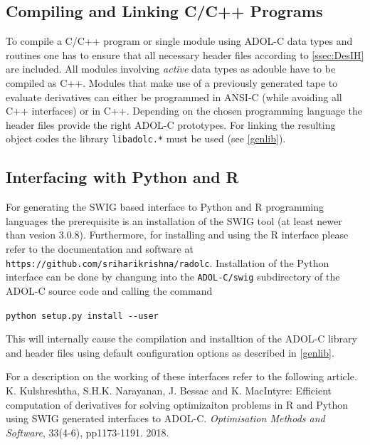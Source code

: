 \documentclass[11pt,twoside]{article}
\begin{document}
\subsection{Compiling and Linking C/C++ Programs}
%
To compile a C/C++ program or single module using ADOL-C
data types and routines one has to ensure that all necessary
header files according to \autoref{ssec:DesIH} are 
included. All modules involving {\em active} data types as
{\sf adouble}
have to be compiled as C++. Modules that make use of a previously
generated tape to evaluate derivatives can either be programmed in ANSI-C
(while avoiding all C++ interfaces) or in C++. Depending
on the chosen programming language the header files provide
the right ADOL-C prototypes. 
For linking the resulting object codes the library \verb=libadolc.*= 
must be used (see \autoref{genlib}). 
\subsection{Interfacing with Python and R}
For generating the SWIG based interface to Python and R programming
languages the prerequisite is an installation of the SWIG tool (at
least newer than vesion 3.0.8). Furthermore, for installing and using
the R interface please refer to the documentation and software at
\verb=https://github.com/sriharikrishna/radolc=.
Installation of the Python interface can be done by changung into the
\verb=ADOL-C/swig= subdirectory of the ADOL-C source code and calling
the command
\begin{center}
\verb=python setup.py install --user=
\end{center}
This will internally cause the compilation and installtion of the
ADOL-C library and header files using default configuration options as
described in \autoref{genlib}.

For a description on the working of these interfaces refer to the
following article.\\[1ex]
K. Kulshreshtha, S.H.K. Narayanan, J. Bessac and K. MacIntyre:
Efficient computation of derivatives for solving optimizaiton problems
in R and Python using SWIG generated interfaces to
ADOL-C. \emph{Optimisation Methods and Software}, 33(4-6),
pp1173-1191. 2018.
%
\end{document}

